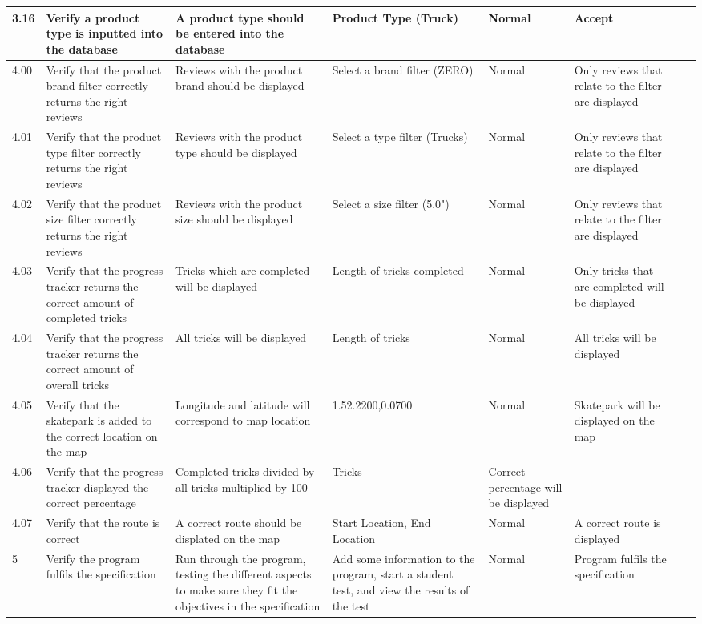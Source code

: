 \begin{landscape}
\begin{center}
\begin{longtable}{|p{1.5cm}|p{2.5cm}|p{2.5cm}|p{2cm}|p{2cm}|p{2cm}|p{2cm}|p{2cm}|}
3.16 & Verify a product type is inputted into the database & A product type should be entered into the database & Product Type (Truck) & Normal & Accept & & \\ \hline



4.00 & Verify that the product brand filter correctly returns the right reviews & Reviews with the product brand should be displayed & Select a brand filter (ZERO) & Normal & Only reviews that relate to the filter are displayed & & \\ \hline

4.01 & Verify that the product type filter correctly returns the right reviews & Reviews with the product type should be displayed & Select a type filter (Trucks) & Normal & Only reviews that relate to the filter are displayed & & \\ \hline

4.02 & Verify that the product size filter correctly returns the right reviews & Reviews with the product size should be displayed & Select a size filter (5.0") & Normal & Only reviews that relate to the filter are displayed & & \\ \hline

4.03 & Verify that the progress tracker returns the correct amount of completed tricks & Tricks which are completed will be displayed & Length of tricks completed & Normal & Only tricks that are completed will be displayed & & \\ \hline

4.04 & Verify that the progress tracker returns the correct amount of overall tricks & All tricks will be displayed & Length of tricks & Normal & All tricks will be displayed & & \\ \hline

4.05 & Verify that the skatepark is added to the correct location on the map & Longitude and latitude will correspond to map location & 1.52.2200,0.0700 & Normal & Skatepark will be displayed on the map & & \\ \hline

4.06 & Verify that the progress tracker displayed the correct percentage & Completed tricks divided by all tricks multiplied by 100  & Tricks & Correct percentage will be displayed & & \\ \hline

4.07 & Verify that the route is correct & A correct route should be displated on the map & Start Location, End Location & Normal & A correct route is displayed & & \\ \hline



5 & Verify the program fulfils the specification & Run through the program, testing the different aspects to make sure they fit the objectives in the specification & Add some information to the program, start a student test, and view the results of the test & Normal & Program fulfils the specification & & \\ \hline

    \end{longtable}
\end{center}
\end{landscape}